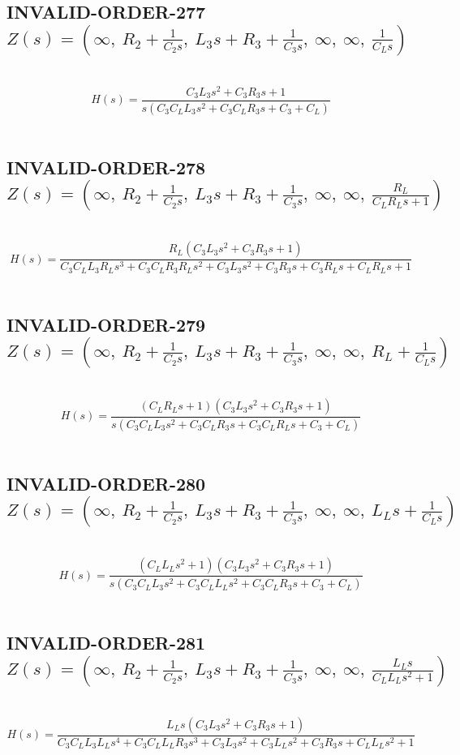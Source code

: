 \documentclass{article}
\begin{document}
\subsection{INVALID-ORDER-277 $Z(s) = \left( \infty, \  R_{2} + \frac{1}{C_{2} s}, \  L_{3} s + R_{3} + \frac{1}{C_{3} s}, \  \infty, \  \infty, \  \frac{1}{C_{L} s}\right)$ } \ 
\textbf{\[H(s) = \frac{C_{3} L_{3} s^{2} + C_{3} R_{3} s + 1}{s \left(C_{3} C_{L} L_{3} s^{2} + C_{3} C_{L} R_{3} s + C_{3} + C_{L}\right)}\] } \ 
\subsection{INVALID-ORDER-278 $Z(s) = \left( \infty, \  R_{2} + \frac{1}{C_{2} s}, \  L_{3} s + R_{3} + \frac{1}{C_{3} s}, \  \infty, \  \infty, \  \frac{R_{L}}{C_{L} R_{L} s + 1}\right)$ } \ 
\textbf{\[H(s) = \frac{R_{L} \left(C_{3} L_{3} s^{2} + C_{3} R_{3} s + 1\right)}{C_{3} C_{L} L_{3} R_{L} s^{3} + C_{3} C_{L} R_{3} R_{L} s^{2} + C_{3} L_{3} s^{2} + C_{3} R_{3} s + C_{3} R_{L} s + C_{L} R_{L} s + 1}\] } \ 
\subsection{INVALID-ORDER-279 $Z(s) = \left( \infty, \  R_{2} + \frac{1}{C_{2} s}, \  L_{3} s + R_{3} + \frac{1}{C_{3} s}, \  \infty, \  \infty, \  R_{L} + \frac{1}{C_{L} s}\right)$ } \ 
\textbf{\[H(s) = \frac{\left(C_{L} R_{L} s + 1\right) \left(C_{3} L_{3} s^{2} + C_{3} R_{3} s + 1\right)}{s \left(C_{3} C_{L} L_{3} s^{2} + C_{3} C_{L} R_{3} s + C_{3} C_{L} R_{L} s + C_{3} + C_{L}\right)}\] } \ 
\subsection{INVALID-ORDER-280 $Z(s) = \left( \infty, \  R_{2} + \frac{1}{C_{2} s}, \  L_{3} s + R_{3} + \frac{1}{C_{3} s}, \  \infty, \  \infty, \  L_{L} s + \frac{1}{C_{L} s}\right)$ } \ 
\textbf{\[H(s) = \frac{\left(C_{L} L_{L} s^{2} + 1\right) \left(C_{3} L_{3} s^{2} + C_{3} R_{3} s + 1\right)}{s \left(C_{3} C_{L} L_{3} s^{2} + C_{3} C_{L} L_{L} s^{2} + C_{3} C_{L} R_{3} s + C_{3} + C_{L}\right)}\] } \ 
\subsection{INVALID-ORDER-281 $Z(s) = \left( \infty, \  R_{2} + \frac{1}{C_{2} s}, \  L_{3} s + R_{3} + \frac{1}{C_{3} s}, \  \infty, \  \infty, \  \frac{L_{L} s}{C_{L} L_{L} s^{2} + 1}\right)$ } \ 
\textbf{\[H(s) = \frac{L_{L} s \left(C_{3} L_{3} s^{2} + C_{3} R_{3} s + 1\right)}{C_{3} C_{L} L_{3} L_{L} s^{4} + C_{3} C_{L} L_{L} R_{3} s^{3} + C_{3} L_{3} s^{2} + C_{3} L_{L} s^{2} + C_{3} R_{3} s + C_{L} L_{L} s^{2} + 1}\] } \ 
\end{document}
